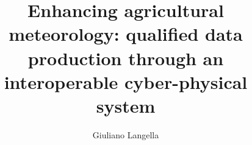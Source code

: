 \documentclass[authoryear,preprint,review,12pt]{elsarticle}
\newcommand{\note}[1]{\emph{\textcolor{red}{#1}}}
\newcommand{\review}[1]{\emph{\textcolor{cyan}{#1}}}
\begin{document}
\begin{frontmatter}



\title{Enhancing agricultural meteorology: qualified data production through an interoperable cyber-physical system}


\author[dia,crisp]{Giuliano Langella}
\address[dia]{Department of Agriculture, University of Naples Federico II, Via Università 100, 80055 Portici, NA, Italy}
\address[crisp]{Interdepartmental Research Centre on Earth Critical Zone, University of Naples Federico II, Via Università 100, 80055 Portici, NA, Italy}



\end{frontmatter}
\end{document}
